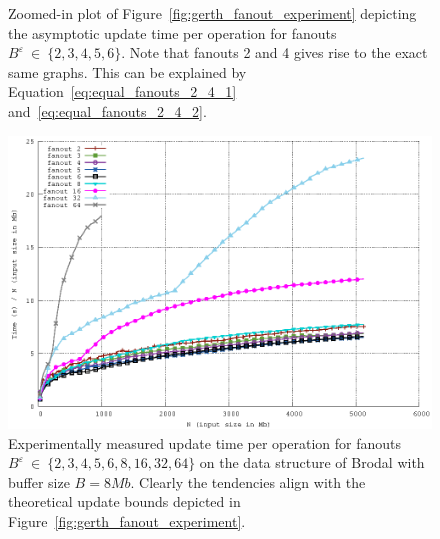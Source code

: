 \documentclass[twoside,11pt,openright]{report}
\def \epsilon {\varepsilon}
\begin{document}
\begin{figure}[h]
\begin{minipage}[t]{0.48\columnwidth}
  \caption{Zoomed-in plot of Figure~\ref{fig:gerth_fanout_experiment} depicting the asymptotic update time per operation for fanouts $B^\epsilon~\in~\{2, 3, 4, 5, 6\}$. Note that fanouts 2 and 4 gives rise to the exact same graphs. This can be explained by Equation~\ref{eq:equal_fanouts_2_4_1} and~\ref{eq:equal_fanouts_2_4_2}.}
  \label{fig:gerth_fanout_experiment_zoom}
\end{minipage}
\centering
\includegraphics[width=\textwidth]{../src/experiments/gerth_fanout_experiment_results/2016-05-06.11_52_24/time}
\caption{Experimentally measured update time per operation for fanouts $B^\epsilon~\in~\{2,3,4,5,6,8,16,32,64\}$ on the data structure of Brodal with buffer size $B = 8 Mb$. Clearly the tendencies align with the theoretical update bounds depicted in Figure~\ref{fig:gerth_fanout_experiment}.}
\label{fig:gerth_fanout_experiment_time}
\end{figure}
\end{document}
